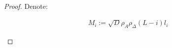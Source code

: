 \begin{proof}
Denote:
\begin{small}
\begin{equation} \label{eq:lip2}
\begin{aligned}
M_i := \sqrt{D} \rho^{}_A \rho^{}_{\Delta} (L-i) l_i 
\end{aligned}
\end{equation}
\end{small}




\end{proof}
